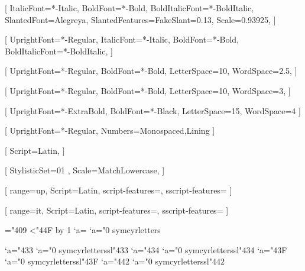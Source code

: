 
% 
%
\setmainfont{Alegreya}[
  ItalicFont=*-Italic,
  BoldFont=*-Bold,
  BoldItalicFont=*-BoldItalic,
  SlantedFont=Alegreya,
  SlantedFeatures={FakeSlant=0.13},
  Scale=0.93925,
]

\setsansfont{AlegreyaSans}[
  UprightFont=*-Regular,
  ItalicFont=*-Italic,
  BoldFont=*-Bold,
  BoldItalicFont=*-BoldItalic,
]

[
  UprightFont=*-Regular,
  BoldFont=*-Bold,
  LetterSpace=10,
  WordSpace=2.5,
]

[
  UprightFont=*-Regular,
  BoldFont=*-Bold,
  LetterSpace=10,
  WordSpace=3,
]

[
  UprightFont=*-ExtraBold,
  BoldFont=*-Black,
  LetterSpace=15,
  WordSpace=4
]

[
  UprightFont=*-Regular,
  Numbers={Monospaced,Lining}
]

[
  Script=Latin,
]

% 
%

\usepackage{unicode-math}

[%
  StylisticSet=01 ,
  Scale=MatchLowercase,
]

[%
  range={up},
  Script=Latin,
  script-features={},
  sscript-features={}
]

[%
  range={it},
  Script=Latin,
  script-features={},
  sscript-features={}
]

\newcommand{\makecyrmathletter}[1]{%
  \begingroup\lccode`a=#1\lowercase{\endgroup
  \Umathcode`a}="0 \csname symcyrletters\endcsname\space #1
}
="409
\loop\ifnum{}<"44F
  \advance{} by 1
  \makecyrmathletter{\count255}
\repeat


\newcommand{\makecyrmathlettersl}[1]{%
  \begingroup\lccode`a=#1\lowercase{\endgroup
  \Umathcode`a}="0 \csname symcyrletterssl\endcsname\space #1
}
\makecyrmathlettersl{"433} %
\makecyrmathlettersl{"434} %
\makecyrmathlettersl{"43F} %
\makecyrmathlettersl{"442} %
